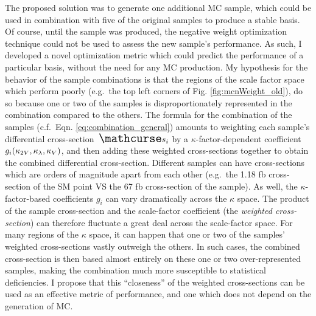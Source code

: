     The proposed solution was to generate one additional MC sample,
        which could be used in combination with five of the original samples to produce a stable basis.
    Of course, until the sample was produced, the negative weight optimization technique could not be used to assess the new sample's performance.
    As such, I developed a novel optimization metric which could predict the performance of a particular basis,
        without the need for any MC production.
    My hypothesis for the behavior of the sample combinations is that the regions of the scale factor space which perform poorly
        (e.g.\ the top left corners of Fig. \ref{fig:mcnWeight_old}),
        do so because one or two of the samples is disproportionately represented in the combination compared to the others.
    The formula for the combination of the samples (c.f.\ Eqn. \ref{eq:combination_general}) amounts to
        weighting each sample's differential cross-section $\xsec_i$ by a $\kappa$-factor-dependent coefficient $g_i(\kappa_{2V},\kappa_{\lambda},\kappa_{V})$,
        and then adding these weighted cross-sections together to obtain the combined differential cross-section.
    Different samples can have cross-sections which are orders of magnitude apart from each other
        (e.g.\ the 1.18 fb cross-section of the SM point VS the 67 fb cross-section of the  sample).
    As well, the $\kappa$-factor-based coefficients $g_i$ can vary dramatically across the $\kappa$ space.
    The product of the sample cross-section and the scale-factor coefficient (the \textit{weighted cross-section})
        can therefore fluctuate a great deal across the scale-factor space.
    For many regions of the $\kappa$ space, it can happen that one or two of the samples' weighted cross-sections vastly outweigh the others.
    In such cases, the combined cross-section is then based almost entirely on these one or two over-represented samples,
        making the combination much more susceptible to statistical deficiencies.
    I propose that this ``closeness'' of the weighted cross-sections can be used as an effective metric of performance,
        and one which does not depend on the generation of MC.

